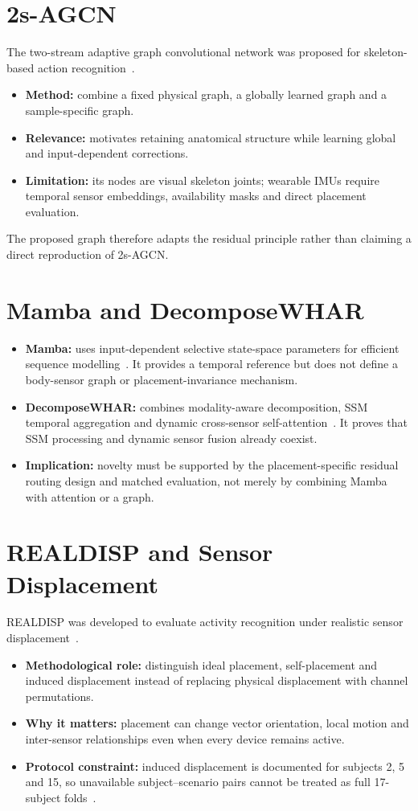 \documentclass[12pt,a4paper,twoside,openright]{report}
\begin{document}
\section{2s-AGCN}
The two-stream adaptive graph convolutional network was proposed for skeleton-based action recognition~\cite{agcn}.
\begin{itemize}
\item \textbf{Method:} combine a fixed physical graph, a globally learned graph and a sample-specific graph.
\item \textbf{Relevance:} motivates retaining anatomical structure while learning global and input-dependent corrections.
\item \textbf{Limitation:} its nodes are visual skeleton joints; wearable IMUs require temporal sensor embeddings, availability masks and direct placement evaluation.
\end{itemize}
The proposed graph therefore adapts the residual principle rather than claiming a direct reproduction of 2s-AGCN.

\section{Mamba and DecomposeWHAR}
\begin{itemize}
\item \textbf{Mamba:} uses input-dependent selective state-space parameters for efficient sequence modelling~\cite{mamba}. It provides a temporal reference but does not define a body-sensor graph or placement-invariance mechanism.
\item \textbf{DecomposeWHAR:} combines modality-aware decomposition, SSM temporal aggregation and dynamic cross-sensor self-attention~\cite{decompose}. It proves that SSM processing and dynamic sensor fusion already coexist.
\item \textbf{Implication:} novelty must be supported by the placement-specific residual routing design and matched evaluation, not merely by combining Mamba with attention or a graph.
\end{itemize}

\section{REALDISP and Sensor Displacement}
REALDISP was developed to evaluate activity recognition under realistic sensor displacement~\cite{realdisp,banos}.
\begin{itemize}
\item \textbf{Methodological role:} distinguish ideal placement, self-placement and induced displacement instead of replacing physical displacement with channel permutations.
\item \textbf{Why it matters:} placement can change vector orientation, local motion and inter-sensor relationships even when every device remains active.
\item \textbf{Protocol constraint:} induced displacement is documented for subjects 2, 5 and 15, so unavailable subject--scenario pairs cannot be treated as full 17-subject folds~\cite{banos}.
\end{itemize}
\end{document}
